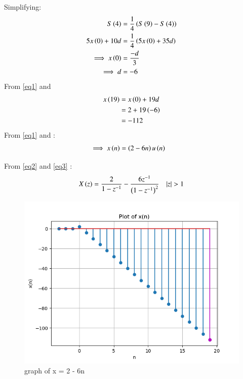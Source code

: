 \documentclass[journal,12pt,twocolumn]{IEEEtran}
\theoremstyle{remark}
\begin{document}
Simplifying:
    \begin{align}
        S\left(4\right) &= \frac{1}{4}\left(S\left(9\right)-S\left(4\right)\right)\\
        5x\left(0\right) + 10d &= \frac{1}{4}\left(5x\left(0\right) + 35d\right)\\
        \implies x\left(0\right) &= \frac{-d}{3}\\
        \implies d &= -6 \label{eq1}
    \end{align}
    From \eqref{eq1} and 
    \begin{align}
        x\left(19\right)&=x\left(0\right)+19d\\
        &=2+19\left(-6\right)\\ 
        &= -112
    \end{align}
From \eqref{eq1} and :
    \begin{align}
        \implies x\left(n\right)&=\left(2-6n\right)u\left(n\right) \label{eq3}
    \end{align}
    
From \eqref{eq2} and \eqref{eq3} :
    \begin{align}
        X\brak{z}=\frac{2}{1-z^{-1}} - \frac{6z^{-1}}{\brak{1-z^{-1}}^{2}} \quad |z|>1
    \end{align}

    \begin{figure}[h]
    \renewcommand\thefigure{1}
        \centering
        \includegraphics[width=1\linewidth]{figs/Figure_1.png}
        \caption{graph of x = 2 - 6n}
    \end{figure}
\end{document}
